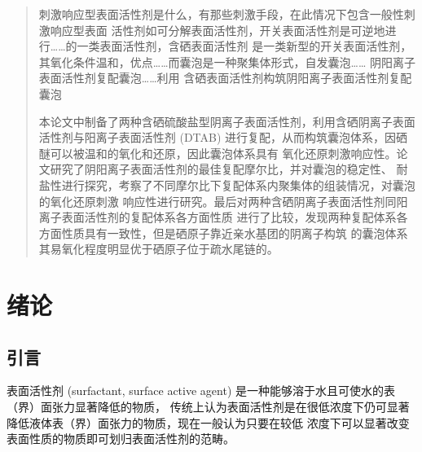 \documentclass[bachelor,fandolfonts,replaceperiod]{jnuthesis}
\author{陈育明}
\institute{江南大学}
\begin{document}
    \maketitle
    \frontmatter
    \begin{abstract}
        刺激响应型表面活性剂是什么，有那些刺激手段，在此情况下包含一般性刺激响应型表面
        活性剂如可分解表面活性剂，开关表面活性剂是可逆地进行……的一类表面活性剂，含硒表面活性剂
        是一类新型的开关表面活性剂，其氧化条件温和，优点……而囊泡是一种聚集体形式，自发囊泡……
        阴阳离子表面活性剂复配囊泡……利用
        含硒表面活性剂构筑阴阳离子表面活性剂复配囊泡
        
        本论文中制备了两种含硒硫酸盐型阴离子表面活性剂，利用含硒阴离子表面活性剂与阳离子表面活性剂
         (DTAB) 进行复配，从而构筑囊泡体系，因硒醚可以被温和的氧化和还原，因此囊泡体系具有
         氧化还原刺激响应性。论文研究了阴阳离子表面活性剂的最佳复配摩尔比，并对囊泡的稳定性、
         耐盐性进行探究，考察了不同摩尔比下复配体系内聚集体的组装情况，对囊泡的氧化还原刺激
         响应性进行研究。最后对两种含硒阴离子表面活性剂同阳离子表面活性剂的复配体系各方面性质
         进行了比较，发现两种复配体系各方面性质具有一致性，但是硒原子靠近亲水基团的阴离子构筑
         的囊泡体系其易氧化程度明显优于硒原子位于疏水尾链的。
    \end{abstract}
    
    \begin{englishabstract}
    \end{englishabstract}
    
    \tableofcontents
    
    \mainmatter
    
    \chapter{绪论}\label{chapter:introduction}
    \section{引言}
    表面活性剂 (surfactant, surface active agent) 是一种能够溶于水且可使水的表（界）面张力显著降低的物质，
    传统上认为表面活性剂是在很低浓度下仍可显著降低液体表（界）面张力的物质，现在一般认为只要在较低
    浓度下可以显著改变表面性质的物质即可划归表面活性剂的范畴。
    
\end{document}
